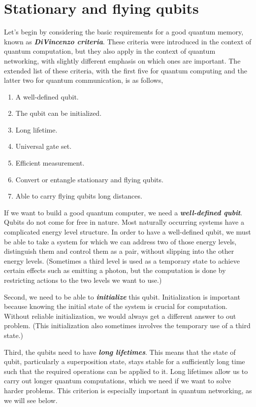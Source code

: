 \section{Stationary and flying qubits}
\label{sec:statinary-and-flying-qubits}

Let's begin by considering the basic requirements for a good quantum memory, known as \textbf{\emph{DiVincenzo criteria}}.
These criteria were introduced in the context of quantum computation, but they also apply in the context of quantum networking, with slightly different emphasis on which ones are important.
The extended list of these criteria, with the first five for quantum computing and the latter two for quantum communication, is as follows,
\begin{enumerate}
    \item A well-defined qubit.
    \item The qubit can be initialized.
    \item Long lifetime.
    \item Universal gate set.
    \item Efficient measurement.
    \item Convert or entangle stationary and flying qubits.
    \item Able to carry flying qubits long distances.
\end{enumerate}

If we want to build a good quantum computer, we need a \textbf{\emph{well-defined qubit}}.
Qubits do not come for free in nature.
Most naturally occurring systems have a complicated energy level structure.
In order to have a well-defined qubit, we must be able to take a system for which we can address two of those energy levels, distinguish them and control them as a pair, without slipping into the other energy levels.
(Sometimes a third level is used as a temporary state to achieve certain effects such as emitting a photon, but the computation is done by restricting actions to the two levels we want to use.)

Second, we need to be able to \textbf{\emph{initialize}} this qubit.
Initialization is important because knowing the initial state of the system is crucial for computation.
Without reliable initialization, we would always get a different answer to out problem.
(This initialization also sometimes involves the temporary use of a third state.)

Third, the qubits need to have \textbf{\emph{long lifetimes}}. This means that the state of qubit, particularly a superposition state, stays stable for a sufficiently long time such that the required operations can be applied to it.
Long lifetimes allow us to carry out longer quantum computations, which we need if we want to solve harder problems.
This criterion is especially important in quantum networking, as we will see below.

